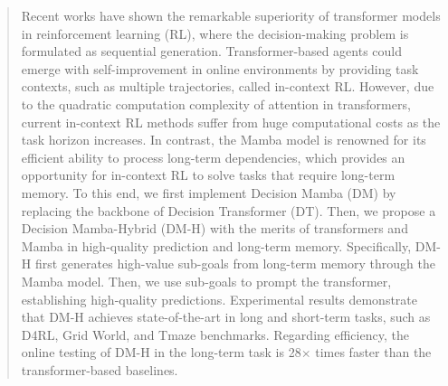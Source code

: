 \begin{abstract}
  Recent works have shown the remarkable superiority of transformer models in reinforcement learning (RL), where the decision-making problem is formulated as sequential generation. Transformer-based agents could emerge with self-improvement in online environments by providing task contexts, such as multiple trajectories, called in-context RL. However, due to the quadratic computation complexity of attention in transformers, current in-context RL methods suffer from huge computational costs as the task horizon increases. In contrast, the Mamba model is renowned for its efficient ability to process long-term dependencies, which provides an opportunity for in-context RL to solve tasks that require long-term memory. To this end, we first implement Decision Mamba (DM) by replacing the backbone of Decision Transformer (DT). Then, we propose a Decision Mamba-Hybrid (DM-H) with the merits of transformers and Mamba in high-quality prediction and long-term memory. Specifically, DM-H first generates high-value sub-goals from long-term memory through the Mamba model. Then, we use sub-goals to prompt the transformer, establishing high-quality predictions. Experimental results demonstrate that DM-H achieves state-of-the-art in long and short-term tasks, such as D4RL, Grid World, and Tmaze benchmarks. Regarding efficiency, the online testing of DM-H in the long-term task is 28$\times$ times faster than the transformer-based baselines.
\end{abstract}

